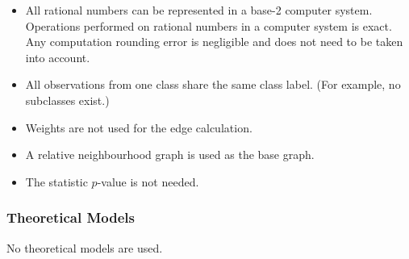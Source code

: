 \documentclass[12pt]{article}
\newcounter{assumpnum} %
\begin{document}
\begin{itemize}

\item[A\refstepcounter{assumpnum}\theassumpnum \label{A:fp}:]
All rational numbers can be represented in a base-2 computer system. Operations performed on rational numbers in a computer system is exact. Any computation rounding error is negligible and does not need to be taken into account.

\item[A\refstepcounter{assumpnum}\theassumpnum \label{A:CWN}:] All observations from one class share the same class label. (For example, no subclasses exist.)


\item[A\refstepcounter{assumpnum}\theassumpnum \label{A:weights}:]
Weights are not used for the edge calculation.

\item[A\refstepcounter{assumpnum}\theassumpnum \label{A:rng}:]
A relative neighbourhood graph is used as the base graph.

\item[A\refstepcounter{assumpnum}\theassumpnum \label{A:pvalue}:]
The statistic $p$-value is not needed.


\end{itemize}

\subsubsection{Theoretical Models}\label{sec:theoretical}

No theoretical models are used.
\end{document}
